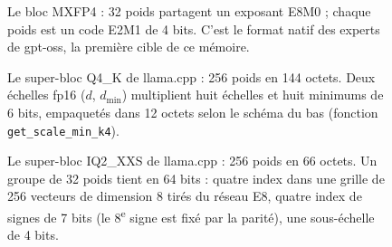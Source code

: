 \begin{figure}[ht]
\centering
\SchemaMXFP
\caption[Le bloc MXFP4]{Le bloc MXFP4 : 32 poids partagent un exposant E8M0 ; chaque poids est un code E2M1 de 4 bits. C'est le format natif des experts de gpt-oss, la première cible de ce mémoire.}
\label{fig:mxfp4}
\end{figure}

\begin{figure}[ht]
\centering
\SchemaQquatreK
\caption[Le super-bloc Q4\_K]{Le super-bloc Q4\_K de llama.cpp : 256 poids en 144 octets. Deux échelles fp16 ($d$, $d_{\min}$) multiplient huit échelles et huit minimums de 6 bits, empaquetés dans 12 octets selon le schéma du bas (fonction \texttt{get\_scale\_min\_k4}).}
\label{fig:q4k}
\end{figure}

\begin{figure}[ht]
\centering
\SchemaIQdeux
\caption[Le super-bloc IQ2\_XXS]{Le super-bloc IQ2\_XXS de llama.cpp : 256 poids en 66 octets. Un groupe de 32 poids tient en 64 bits : quatre index dans une grille de 256 vecteurs de dimension 8 tirés du réseau E8, quatre index de signes de 7 bits (le 8\textsuperscript{e} signe est fixé par la parité), une sous-échelle de 4 bits.}
\label{fig:iq2xxs}
\end{figure}

